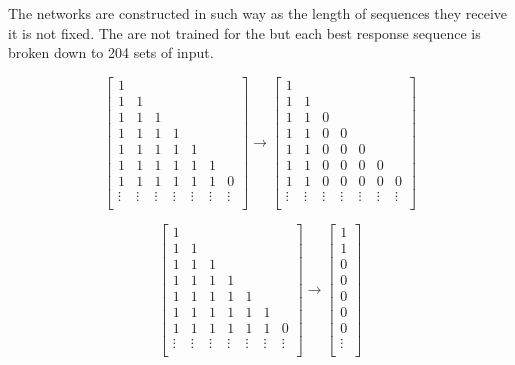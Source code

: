 The networks are constructed in such way as the length of sequences they receive
it is not fixed. The are not trained for the \totalsequences but each
best response sequence is broken down to 204 sets of input.

\begin{equation}
    \begin{bmatrix}
        1 &  &  \\
        1 & 1 &  \\
        1 & 1 & 1 \\
        1 & 1 & 1 & 1 \\
        1 & 1 & 1 & 1 & 1 \\
        1 & 1 & 1 & 1 & 1 & 1\\
        1 & 1 & 1 & 1 & 1 & 1 & 0 \\
        \vdots & \vdots & \vdots & \vdots & \vdots & \vdots & \vdots \\
    \end{bmatrix} \to 
    \begin{bmatrix}
        1 &  &  \\
        1 & 1 &  \\
        1 & 1 & 0 \\
        1 & 1 & 0 & 0 \\
        1 & 1 & 0 & 0 & 0 \\
        1 & 1 & 0 & 0 & 0 & 0\\
        1 & 1 & 0 & 0 & 0 & 0 & 0 \\
        \vdots & \vdots & \vdots & \vdots & \vdots & \vdots & \vdots \\
    \end{bmatrix}
\end{equation}

\begin{equation}
    \begin{bmatrix}
        1 &  &  \\
        1 & 1 &  \\
        1 & 1 & 1 \\
        1 & 1 & 1 & 1 \\
        1 & 1 & 1 & 1 & 1 \\
        1 & 1 & 1 & 1 & 1 & 1\\
        1 & 1 & 1 & 1 & 1 & 1 & 0 \\
        \vdots & \vdots & \vdots & \vdots & \vdots & \vdots & \vdots \\
    \end{bmatrix} \to 
    \begin{bmatrix}
        1 \\
        1 \\
        0 \\
        0 \\
        0 \\
        0 \\
        0 \\
        \vdots \\
    \end{bmatrix}
\end{equation}

